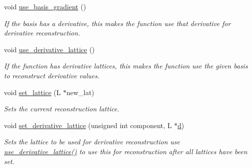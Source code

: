 \begin{DoxyCompactItemize}
\mbox{\label{classsisl_1_1si__function_a087ba11d61cfb8e6497d55bd66b2d180}} 
void \hyperlink{classsisl_1_1si__function_a087ba11d61cfb8e6497d55bd66b2d180}{use\+\_\+basis\+\_\+gradient} ()
\begin{DoxyCompactList}\small\item\em If the basis has a derivative, this makes the function use that derivative for derivative reconstruction. \end{DoxyCompactList}\item 
\mbox{\label{classsisl_1_1si__function_adf0831bf77e806ab9a5dc225ceaeaaed}} 
void \hyperlink{classsisl_1_1si__function_adf0831bf77e806ab9a5dc225ceaeaaed}{use\+\_\+derivative\+\_\+lattice} ()
\begin{DoxyCompactList}\small\item\em If the function has derivative lattices, this makes the function use the given basis to reconstruct derivative values. \end{DoxyCompactList}\item 
\mbox{\label{classsisl_1_1si__function_ae012b0152662bc9e331fc668e3332729}} 
void \hyperlink{classsisl_1_1si__function_ae012b0152662bc9e331fc668e3332729}{set\+\_\+lattice} (L $\ast$new\+\_\+lat)
\begin{DoxyCompactList}\small\item\em Sets the current reconstruction lattice. \end{DoxyCompactList}\item 
\mbox{\label{classsisl_1_1si__function_a602180d6d0539667aca13b1f5d071cfc}} 
void \hyperlink{classsisl_1_1si__function_a602180d6d0539667aca13b1f5d071cfc}{set\+\_\+derivative\+\_\+lattice} (unsigned int component, L $\ast$\hyperlink{classsisl_1_1si__function_acb42bd4f8b06bc38708ae2ccf8ad6b93}{d})
\begin{DoxyCompactList}\small\item\em Sets the lattice to be used for derivative reconstruction use \hyperlink{classsisl_1_1si__function_adf0831bf77e806ab9a5dc225ceaeaaed}{use\+\_\+derivative\+\_\+lattice()} to use this for reconstruction after all lattices have been set. \end{DoxyCompactList}\item 
\mbox{\label{classsisl_1_1si__function_adaac36945118aaededcba9344f5be1ce}} 

\end{DoxyCompactItemize}
